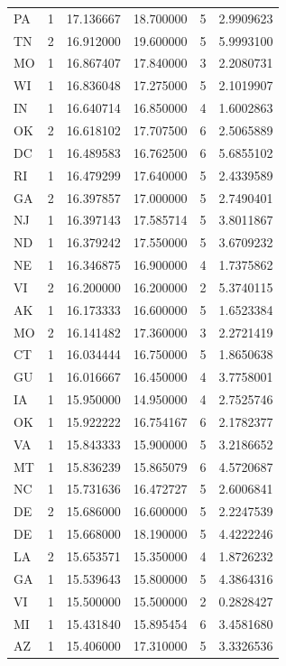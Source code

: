 \documentclass[
  letterpaper,
  DIV=11,
  numbers=noendperiod]{scrartcl}
\begin{document}
\begin{longtable}[t]{lrrrrr}
\addlinespace
PA & 1 & 17.136667 & 18.700000 & 5 & 2.9909623\\
TN & 2 & 16.912000 & 19.600000 & 5 & 5.9993100\\
MO & 1 & 16.867407 & 17.840000 & 3 & 2.2080731\\
WI & 1 & 16.836048 & 17.275000 & 5 & 2.1019907\\
IN & 1 & 16.640714 & 16.850000 & 4 & 1.6002863\\
\addlinespace
OK & 2 & 16.618102 & 17.707500 & 6 & 2.5065889\\
DC & 1 & 16.489583 & 16.762500 & 6 & 5.6855102\\
RI & 1 & 16.479299 & 17.640000 & 5 & 2.4339589\\
GA & 2 & 16.397857 & 17.000000 & 5 & 2.7490401\\
NJ & 1 & 16.397143 & 17.585714 & 5 & 3.8011867\\
\addlinespace
ND & 1 & 16.379242 & 17.550000 & 5 & 3.6709232\\
NE & 1 & 16.346875 & 16.900000 & 4 & 1.7375862\\
VI & 2 & 16.200000 & 16.200000 & 2 & 5.3740115\\
AK & 1 & 16.173333 & 16.600000 & 5 & 1.6523384\\
MO & 2 & 16.141482 & 17.360000 & 3 & 2.2721419\\
\addlinespace
CT & 1 & 16.034444 & 16.750000 & 5 & 1.8650638\\
GU & 1 & 16.016667 & 16.450000 & 4 & 3.7758001\\
IA & 1 & 15.950000 & 14.950000 & 4 & 2.7525746\\
OK & 1 & 15.922222 & 16.754167 & 6 & 2.1782377\\
VA & 1 & 15.843333 & 15.900000 & 5 & 3.2186652\\
\addlinespace
MT & 1 & 15.836239 & 15.865079 & 6 & 4.5720687\\
NC & 1 & 15.731636 & 16.472727 & 5 & 2.6006841\\
DE & 2 & 15.686000 & 16.600000 & 5 & 2.2247539\\
DE & 1 & 15.668000 & 18.190000 & 5 & 4.4222246\\
LA & 2 & 15.653571 & 15.350000 & 4 & 1.8726232\\
\addlinespace
GA & 1 & 15.539643 & 15.800000 & 5 & 4.3864316\\
VI & 1 & 15.500000 & 15.500000 & 2 & 0.2828427\\
MI & 1 & 15.431840 & 15.895454 & 6 & 3.4581680\\
AZ & 1 & 15.406000 & 17.310000 & 5 & 3.3326536\\

\end{longtable}
\end{document}
